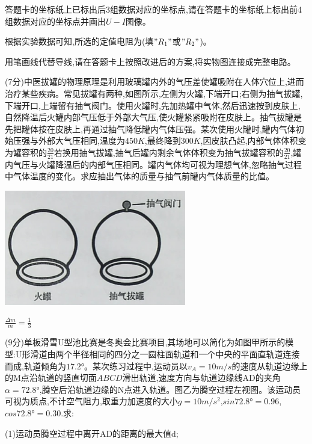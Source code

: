 答题卡的坐标纸上已标出后3组数据对应的坐标点,请在答题卡的坐标纸上标出前4组数据对应的坐标点并画出$U-I$图像。

根据实验数据可知,所选的定值电阻为(填$"R_1"$或$"R_2"$)。

用笔画线代替导线,请在答题卡上按照改进后的方案,将实物图连接成完整电路。

\newpage
\question[6] (7分)中医拔罐的物理原理是利用玻璃罐内外的气压差使罐吸附在人体穴位上,进而治疗某些疾病。常见拔罐有两种,如图所示,左侧为火罐,下端开口;右侧为抽气拔罐,下端开口,上端留有抽气阀门。使用火罐时,先加热罐中气体,然后迅速按到皮肤上,自然降温后火罐内部气压低于外部大气压,使火罐紧紧吸附在皮肤上。抽气拔罐是先把罐体按在皮肤上,再通过抽气降低罐内气体压强。某次使用火罐时,罐内气体初始压强与外部大气压相同,温度为$450K$,最终降到$300K$,因皮肤凸起,内部气体体积变为罐容积的$\frac{20}{21}$若换用抽气拔罐,抽气后罐内剩余气体体积变为抽气拔罐容积的$\frac{20}{21}$,罐内气压与火罐降温后的内部气压相同。罐内气体均可视为理想气体,忽略抽气过程中气体温度的变化。求应抽出气体的质量与抽气前罐内气体质量的比值。\begin{center}\includegraphics[]{img/image13.png}\end{center}
\begin{solution}{4cm}
    $\frac{\Delta m}{m}=\frac{1}{3}$
\end{solution}
\question[6] (9分)单板滑雪U型池比赛是冬奥会比赛项目,其场地可以简化为如图甲所示的模型:U形滑道由两个半径相同的四分之一圆柱面轨道和一个中央的平面直轨道连接而成,轨道倾角为$17.2°$。某次练习过程中,运动员以$v_A=10m/s$的速度从轨道边缘上的M点沿轨道的竖直切面$ABCD$滑出轨道,速度方向与轨道边缘线AD的夹角$α=72.8°$,腾空后沿轨道边缘的N点进入轨道。图乙为腾空过程左视图。该运动员可视为质点,不计空气阻力,取重力加速度的大小$g=10m/s^2$,$sin72.8°=0.96$,$cos72.8°=0.30.$求:

(1)运动员腾空过程中离开AD的距离的最大值d;

